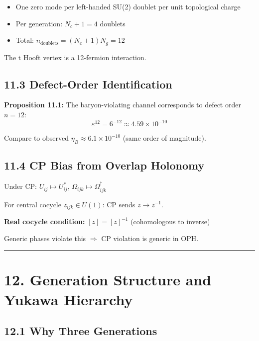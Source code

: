 \begin{itemize}
\tightlist
\item
  One zero mode per left-handed SU(2) doublet per unit topological charge
\item
  Per generation: \(N_c + 1 = 4\) doublets
\item
  Total: \(n_{\text{doublets}} = (N_c + 1)N_g = 12\)
\end{itemize}

The \textquotesingle t Hooft vertex is a 12-fermion interaction.

\subsection{11.3 Defect-Order Identification}\label{113-defect-order-identification}

\textbf{Proposition 11.1:} The baryon-violating channel corresponds to defect order \(n = 12\): \[\varepsilon^{12} = 6^{-12} \approx 4.59 \times 10^{-10}\]

Compare to observed \(\eta_B \approx 6.1 \times 10^{-10}\) (same order of magnitude).

\subsection{11.4 CP Bias from Overlap Holonomy}\label{114-cp-bias-from-overlap-holonomy}

Under CP: \(U_{ij} \mapsto U_{ij}^*\), \(\Omega_{ijk} \mapsto \Omega_{ijk}^\dagger\)

For central cocycle \(z_{ijk} \in U(1)\): CP sends \(z \to z^{-1}\).

\textbf{Real cocycle condition:} \([z] = [z]^{-1}\) (cohomologous to inverse)

Generic phases violate this \(\Rightarrow\) CP violation is generic in OPH.

\begin{center}\rule{0.5\linewidth}{0.5pt}\end{center}

\section{12. Generation Structure and Yukawa Hierarchy}\label{12-generation-structure-and-yukawa-hierarchy}

\subsection{12.1 Why Three Generations}\label{121-why-three-generations}

